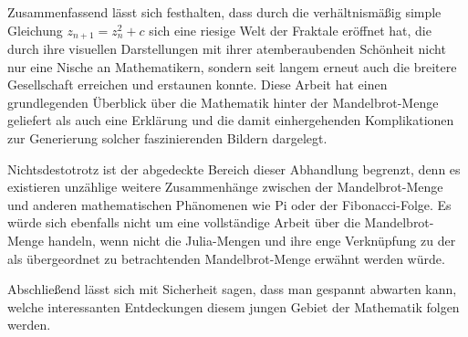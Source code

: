
Zusammenfassend lässt sich festhalten, dass durch die verhältnismäßig simple
Gleichung $z_{n+1} = z_n^2 + c$ sich eine riesige Welt der Fraktale eröffnet
hat, die durch ihre visuellen Darstellungen mit ihrer atemberaubenden Schönheit
nicht nur eine Nische an Mathematikern, sondern seit langem erneut auch die
breitere Gesellschaft erreichen und erstaunen konnte.
Diese Arbeit hat einen grundlegenden Überblick über die Mathematik hinter der
Mandelbrot-Menge geliefert als auch eine Erklärung und die damit einhergehenden
Komplikationen zur Generierung solcher faszinierenden Bildern dargelegt.

Nichtsdestotrotz ist der abgedeckte Bereich dieser Abhandlung begrenzt, denn es
existieren unzählige weitere Zusammenhänge zwischen der Mandelbrot-Menge und
anderen mathematischen Phänomenen wie Pi oder der Fibonacci-Folge.
Es würde sich ebenfalls nicht um eine vollständige Arbeit über die
Mandelbrot-Menge handeln, wenn nicht die Julia-Mengen und ihre enge Verknüpfung
zu der als übergeordnet zu betrachtenden Mandelbrot-Menge erwähnt werden würde.

Abschließend lässt sich mit Sicherheit sagen, dass man gespannt abwarten kann,
welche interessanten Entdeckungen diesem jungen Gebiet der Mathematik folgen
werden.